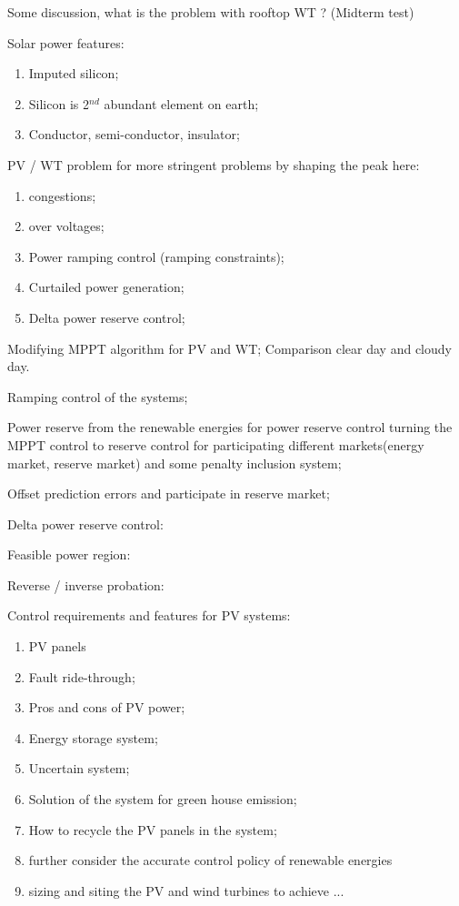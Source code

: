 \documentclass{article}
\newcommand{\slw}{\color{red}}
\begin{document}
Some discussion, what is the problem with rooftop WT ? (Midterm test)

Solar power features:
\begin{enumerate}
  \item Imputed silicon;
  \item Silicon is 2$^{nd}$ abundant element on earth;
  \item Conductor, semi-conductor, insulator;
\end{enumerate}

PV / WT problem for more stringent problems by shaping the peak here:
\begin{enumerate}
  \item congestions;
  \item over voltages;
  \item Power ramping control (ramping constraints);
  \item Curtailed power generation;
  \item Delta power reserve control;
\end{enumerate}

Modifying MPPT algorithm for PV and WT; 
Comparison clear day and cloudy day.

Ramping control of the systems;

Power reserve from the renewable energies for power reserve control {\slw turning the MPPT control to reserve control for participating different markets(energy market, reserve market) and some penalty inclusion system}; 

Offset prediction errors and participate in reserve market;

Delta power reserve control: 

Feasible power region: 

Reverse / inverse probation: 

Control requirements and features for PV systems:
\begin{enumerate}
  \item PV panels
  \item Fault ride-through;
  \item Pros and cons of PV power;
  \item Energy storage system;
  \item Uncertain system;
  \item Solution of the system for green house emission;
  \item How to recycle the PV panels in the system;
  \item {\slw further consider the accurate control policy of renewable energies}
  \item {\slw sizing and siting the PV and wind turbines to achieve ...}
\end{enumerate}
\end{document}

